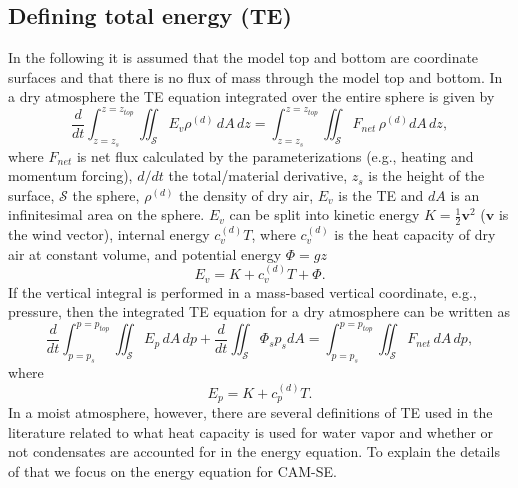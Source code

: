 \documentclass[draft,linenumbers]{agujournal}
\begin{document}
\subsection{Defining total energy (TE)}\label{sec:defE}
In the following it is assumed that the model top and bottom are coordinate surfaces and that there is no flux of mass through the model top and bottom. In a dry {\color{red}{hydrostatic}} atmosphere the TE equation integrated over the entire sphere is given by
\begin{equation}
\frac{d}{dt}\int_{z=z_s}^{z=z_{top}}\iint_{\mathcal{S}} E_v \rho^{(d)}\, dA\, dz=\int_{z=z_s}^{z=z_{top}}\iint_{\mathcal{S}} F_{net}\, \rho^{(d)} dA\, dz,
\end{equation}
\citep[e.g., ][]{K1974MWR} where $F_{net}$ is net flux calculated by the parameterizations (e.g., heating and momentum forcing), $d/dt$ the total/material derivative, $z_s$ is the height of the surface, $\mathcal{S}$ the sphere, $\rho^{(d)}$ the density of dry air, $E_v$ is the TE and $dA$ is an infinitesimal area on the sphere. $E_v$ can be split into kinetic energy $K=\frac{1}{2}\mathbf{v}^2$ ($\mathbf{v}$ is the wind vector), internal energy $c_v^{(d)}T$, where $c_v^{(d)}$ is the heat capacity of dry air at constant volume, and potential energy $\Phi=gz$
\begin{equation}
E_v=K+c_v^{(d)}T+\Phi.
\end{equation}
If the vertical integral is performed in a mass-based vertical coordinate, e.g., pressure, then the integrated TE equation for a dry atmosphere can be written as
\begin{equation}
\frac{d}{dt}\int_{p=p_s}^{p=p_{top}}\iint_{\mathcal{S}} E_p \, dA\, dp + \frac{d}{dt}\iint_{\mathcal{S}}\Phi_sp_s dA =\int_{p=p_s}^{p=p_{top}}\iint_{\mathcal{S}} F_{net}\, dA\, dp,
\end{equation}
\citep[e.g., ][]{K1974MWR} where
\begin{equation}
E_p=K+c_p^{(d)}T.
\end{equation}
In a moist atmosphere, however, there are several definitions of TE used in the literature related to what heat capacity is used for water vapor and whether or not condensates are accounted for in the energy equation. To explain the details of that we focus on the energy equation for CAM-SE.
\end{document}

